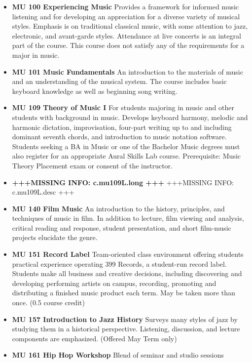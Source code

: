 \documentclass[
  letterpaper,
]{scrbook}
\providecommand{\tightlist}{%
  \setlength{\itemsep}{0pt}\setlength{\parskip}{0pt}}
\begin{document}
\begin{itemize}
\tightlist
\item
  \textbf{MU 100 Experiencing Music} Provides a framework for informed
  music listening and for developing an appreciation for a diverse
  variety of musical styles. Emphasis is on traditional classical music,
  with some attention to jazz, electronic, and avant-garde styles.
  Attendance at live concerts is an integral part of the course. This
  course does not satisfy any of the requirements for a major in music.
\item
  \textbf{MU 101 Music Fundamentals} An introduction to the materials of
  music and an understanding of the musical system. The course includes
  basic keyboard knowledge as well as beginning song writing.
\item
  \textbf{MU 109 Theory of Music I} For students majoring in music and
  other students with background in music. Develops keyboard harmony,
  melodic and harmonic dictation, improvisation, four-part writing up to
  and including dominant seventh chords, and introduction to music
  notation software. Students seeking a BA in Music or one of the
  Bachelor Music degrees must also register for an appropriate Aural
  Skills Lab course. Prerequisite: Music Theory Placement exam or
  consent of the instructor.
\item
  \textbf{+++MISSING INFO: c.mu109L.long +++} +++MISSING INFO:
  c.mu109L.desc +++
\item
  \textbf{MU 140 Film Music} An introduction to the history, principles,
  and techniques of music in film. In addition to lecture, film viewing
  and analysis, critical reading and response, student presentation, and
  short film-music projects elucidate the genre.
\item
  \textbf{MU 151 Record Label} Team-oriented class environment offering
  students practical experience operating 399 Records, a student-run
  record label. Students make all business and creative decisions,
  including discovering and developing performing artists on campus,
  recording, promoting and distributing a finished music product each
  term. May be taken more than once. (0.5 course credit)
\item
  \textbf{MU 157 Introduction to Jazz History} Surveys many styles of
  jazz by studying them in a historical perspective. Listening,
  discussion, and lecture components are emphasized. (Offered May Term
  only)
\item
  \textbf{MU 161 Hip Hop Workshop} Blend of seminar and studio sessions

\end{itemize}
\end{document}
